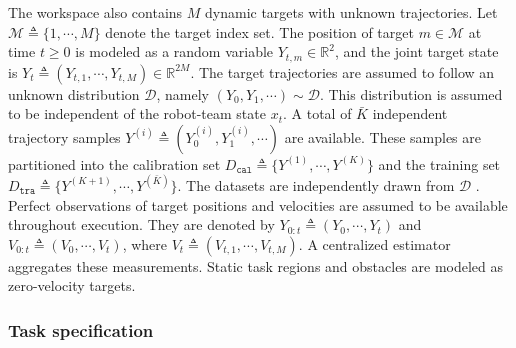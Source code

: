 The workspace also contains $M$ dynamic targets with unknown
trajectories. Let $\mathcal{M} \triangleq \{1,\cdots,M\}$ denote the
target index set. The position of target $m \in \mathcal{M}$ at time
$t \geq 0$ is modeled as a random variable
$Y_{t,m} \in \mathbb{R}^{2}$, and the joint target state is
$Y_t \triangleq (Y_{t,1},\cdots,Y_{t,M}) \in \mathbb{R}^{2M}$. The
target trajectories are assumed to follow an unknown distribution
$\mathcal{D}$, namely $(Y_0,Y_1,\cdots) \sim \mathcal{D}$. This
distribution is assumed to be independent of the robot-team state $x_t$.
A total of $\bar{K}$ independent trajectory samples
$Y^{(i)} \triangleq (Y_0^{(i)},Y_1^{(i)},\cdots)$ are available. These
samples are partitioned into the calibration set
$D_{\texttt{cal}} \triangleq \{Y^{(1)},\cdots,Y^{(K)}\}$ and the
training set
$D_{\texttt{tra}} \triangleq \{Y^{(K+1)},\cdots,Y^{(\bar{K})}\}$. The
datasets are independently drawn from $\mathcal{D}$
\citep{Lars2023CP,Matthew2024CP}. Perfect observations of target
positions and velocities are assumed to be available throughout
execution. They are denoted by
$Y_{0:t} \triangleq (Y_0,\cdots,Y_t)$ and
$V_{0:t} \triangleq (V_0,\cdots,V_t)$, where
$V_t \triangleq (V_{t,1},\cdots,V_{t,M})$. A centralized estimator aggregates
these measurements. Static task regions and obstacles are modeled as
zero-velocity targets.

\subsubsection{Task specification}
\label{ch06:subsec:task-specification}

